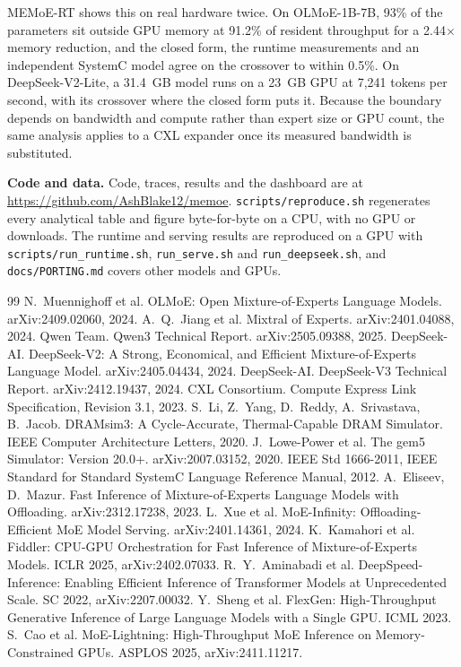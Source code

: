 \documentclass[10pt,a4paper]{article}
\begin{document}
MEMoE-RT shows this on real hardware twice. On OLMoE-1B-7B, 93\% of the parameters
sit outside GPU memory at 91.2\% of resident throughput for a 2.44$\times$ memory
reduction, and the closed form, the runtime measurements and an independent SystemC
model agree on the crossover to within 0.5\%. On DeepSeek-V2-Lite, a 31.4~GB model
runs on a 23~GB GPU at 7{,}241 tokens per second, with its crossover where the
closed form puts it. Because the boundary depends on bandwidth and compute rather than expert
size or GPU count, the same analysis applies to a CXL expander once its measured
bandwidth is substituted.

\vspace{4pt}
\noindent\textbf{Code and data.} Code, traces, results and the dashboard are at
\url{https://github.com/AshBlake12/memoe}. \texttt{scripts/reproduce.sh}
regenerates every analytical table and figure byte-for-byte on a CPU, with no GPU
or downloads. The runtime and serving results are reproduced on a GPU with
\texttt{scripts/run\_runtime.sh}, \texttt{run\_serve.sh} and
\texttt{run\_deepseek.sh}, and \texttt{docs/PORTING.md} covers other models and GPUs.

\small
\begin{thebibliography}{99}
\setlength{\itemsep}{0pt}
 N.~Muennighoff et al. OLMoE: Open Mixture-of-Experts Language Models. arXiv:2409.02060, 2024.
 A.~Q.~Jiang et al. Mixtral of Experts. arXiv:2401.04088, 2024.
 Qwen Team. Qwen3 Technical Report. arXiv:2505.09388, 2025.
 DeepSeek-AI. DeepSeek-V2: A Strong, Economical, and Efficient Mixture-of-Experts Language Model. arXiv:2405.04434, 2024.
 DeepSeek-AI. DeepSeek-V3 Technical Report. arXiv:2412.19437, 2024.
 CXL Consortium. Compute Express Link Specification, Revision 3.1, 2023.
 S.~Li, Z.~Yang, D.~Reddy, A.~Srivastava, B.~Jacob. DRAMsim3: A Cycle-Accurate, Thermal-Capable DRAM Simulator. IEEE Computer Architecture Letters, 2020.
 J.~Lowe-Power et al. The gem5 Simulator: Version 20.0+. arXiv:2007.03152, 2020.
 IEEE Std 1666-2011, IEEE Standard for Standard SystemC Language Reference Manual, 2012.
 A.~Eliseev, D.~Mazur. Fast Inference of Mixture-of-Experts Language Models with Offloading. arXiv:2312.17238, 2023.
 L.~Xue et al. MoE-Infinity: Offloading-Efficient MoE Model Serving. arXiv:2401.14361, 2024.
 K.~Kamahori et al. Fiddler: CPU-GPU Orchestration for Fast Inference of Mixture-of-Experts Models. ICLR 2025, arXiv:2402.07033.
 R.~Y.~Aminabadi et al. DeepSpeed-Inference: Enabling Efficient Inference of Transformer Models at Unprecedented Scale. SC 2022, arXiv:2207.00032.
 Y.~Sheng et al. FlexGen: High-Throughput Generative Inference of Large Language Models with a Single GPU. ICML 2023.
 S.~Cao et al. MoE-Lightning: High-Throughput MoE Inference on Memory-Constrained GPUs. ASPLOS 2025, arXiv:2411.11217.
\end{thebibliography}
\end{document}
